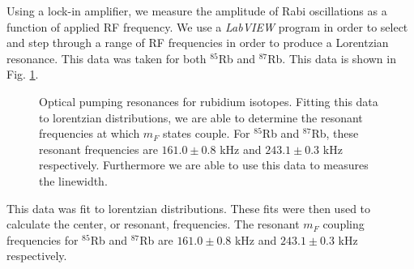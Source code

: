 Using a lock-in amplifier, we measure the amplitude of Rabi oscillations as a function of applied RF frequency.  We use a \emph{LabVIEW} program in order to select and step through a range of RF frequencies in order to produce a Lorentzian resonance.  This data was taken for both $^{85}$Rb and $^{87}$Rb.   This data is shown in Fig. \ref{fig:rawcurve}.    
\begin{figure}[h!]
\begin{center}
\hspace{-1mm}
\vspace{-2mm}
\vspace{-2mm}
\caption{\small{Optical pumping resonances for rubidium isotopes. Fitting this data to lorentzian distributions, we are able to determine the resonant frequencies at which $m_F$ states couple. For $^{85}$Rb and $^{87}$Rb, these resonant frequencies are $161.0 \pm 0.8$ kHz and $243.1\pm 0.3$ kHz respectively. Furthermore we are able to use this data to measures the linewidth.}}
\label{fig:rawcurve}
\end{center}
\end{figure}
This data was fit to lorentzian distributions.  These fits were then used to calculate the center, or resonant,  frequencies.  The resonant $m_F$ coupling frequencies for $^{85}$Rb and $^{87}$Rb are $161.0 \pm 0.8$ kHz and $243.1\pm 0.3$ kHz respectively.  

